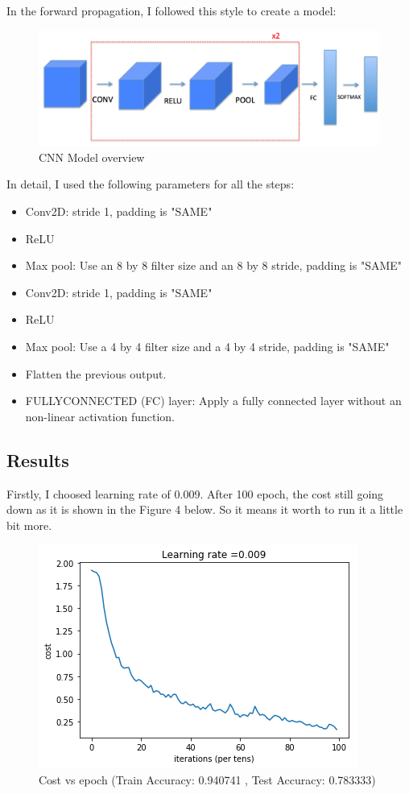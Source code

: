 \documentclass{article}
\begin{document}
In the forward propagation, I followed this style to create a model:
\begin{figure}[h!]
	\centering
	\includegraphics[scale=0.55]{model.png}
	\caption{CNN Model overview}
	\label{fig:univerise}
\end{figure}


In detail, I used the following parameters for all the steps:

\begin{itemize}
	\item Conv2D: stride 1, padding is "SAME"\
	\item ReLU
	\item Max pool: Use an 8 by 8 filter size and an 8 by 8 stride, padding is "SAME"
	\item Conv2D: stride 1, padding is "SAME"
	\item ReLU
	\item Max pool: Use a 4 by 4 filter size and a 4 by 4 stride, padding is "SAME"
	\item Flatten the previous output.
	\item FULLYCONNECTED (FC) layer: Apply a fully connected layer without an non-linear activation function.
\end{itemize}

\subsection{Results}
Firstly, I choosed learning rate of 0.009. After 100 epoch, the cost still going down as it is shown in the Figure 4 below. So it means it worth to run it a little bit more.

\begin{figure}[h!]
	\centering
	\includegraphics[scale=0.55]{result009ep100.png}
	\caption{Cost vs epoch (Train Accuracy: 0.940741 ,  Test Accuracy: 0.783333)}
	\label{fig:univerise}
\end{figure}
\end{document}
